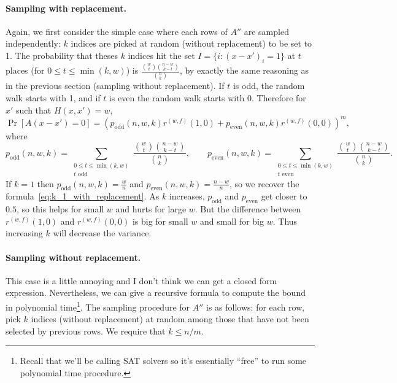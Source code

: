 \documentclass[11pt]{article}
\begin{document}
\paragraph{Sampling with replacement.}
Again, we first consider the simple case where each rows of $A''$ are sampled
independently: $k$ indices are picked at random (without replacement) to be set
to 1.
The probability that theses $k$ indices hit the set $I = \{ i \colon (x - x')_i
= 1 \}$ at $t$ places (for $0 \leq t \leq \min(k, w)$) is $\frac{\binom{w}{t} \binom{n
    - w}{k - t}}{\binom{n}{k}}$, by exactly the same reasoning as in the
previous section (sampling without replacement). 
If $t$ is odd, the random walk starts with 1, and if $t$ is even the random walk
starts with 0.
Therefore for $x'$ such that $H(x, x') = w$,
\begin{equation*}
  \Pr[A(x - x') = 0] = \left(
    p_\mathrm{odd}(n, w, k) r^{(w, f)}(1, 0) + p_\mathrm{even}(n, w, k)
    r^{(w, f)}(0, 0)\right)^m, 
  \label{eq:k_large_with_replacement}
\end{equation*}
where
\begin{equation*}
  p_\mathrm{odd}(n, w, k) = \sum_{\substack{0 \leq t \leq \min(k, w) \\ t \text{ odd}}} \frac{\binom{w}{t}
        \binom{n-w}{k-t}}{\binom{n}{k}}, \qquad
  p_\mathrm{even}(n, w, k) = \sum_{\substack{0 \leq t \leq \min(k, w) \\ t \text{ even}}} \frac{\binom{w}{t}
        \binom{n-w}{k-t}}{\binom{n}{k}}.
\end{equation*}
If $k = 1$ then $p_\mathrm{odd}(n, w, k) = \frac{w}{n}$ and
$p_\mathrm{even}(n, w, k) = \frac{n - w}{n}$, so we recover the formula~\eqref{eq:k_1_with_replacement}.
As $k$ increases, $p_\mathrm{odd}$ and $p_\mathrm{even}$ get closer to $0.5$, so
this helps for small $w$ and hurts for large $w$.
But the difference between $r^{(w, f)}(1, 0)$ and $r^{(w, f)}(0, 0)$ is big for
small $w$ and small for big $w$.
Thus increasing $k$ will decrease the variance.

\paragraph{Sampling without replacement.}
This case is a little annoying and I don't think we can get a closed form
expression.
Nevertheless, we can give a recursive formula to compute the bound in polynomial
time\footnote{Recall that we'll be calling SAT solvers so it's essentially
  ``free'' to run some polynomial time procedure.}.
The sampling procedure for $A''$ is as follows: for each row, pick $k$ indices
(without replacement) at random among those that have not been selected by
previous rows.
We require that $k \leq n / m$.
\end{document}
